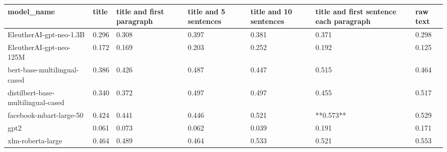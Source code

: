 \begin{tabular}{lllllll}
\toprule
                        model\_name & title & title and first paragraph & title and 5 sentences & title and 10 sentences & title and first sentence each paragraph & raw text \\
\midrule
           EleutherAI-gpt-neo-1.3B & 0.296 &                     0.308 &                 0.397 &                  0.381 &                                   0.371 &    0.298 \\
           EleutherAI-gpt-neo-125M & 0.172 &                     0.169 &                 0.203 &                  0.252 &                                   0.192 &    0.125 \\
      bert-base-multilingual-cased & 0.386 &                     0.426 &                 0.487 &                  0.447 &                                   0.515 &    0.464 \\
distilbert-base-multilingual-cased & 0.340 &                     0.372 &                 0.497 &                  0.497 &                                   0.455 &    0.517 \\
           facebook-mbart-large-50 & 0.424 &                     0.441 &                 0.446 &                  0.521 &                               **0.573** &    0.529 \\
                              gpt2 & 0.061 &                     0.073 &                 0.062 &                  0.039 &                                   0.191 &    0.171 \\
                 xlm-roberta-large & 0.464 &                     0.489 &                 0.464 &                  0.533 &                                   0.521 &    0.553 \\
\bottomrule
\end{tabular}
